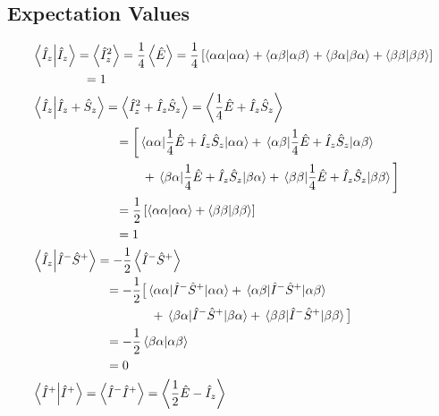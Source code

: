\begin{appendixtext}
\subsection{Expectation Values}
\begin{align*}
&\bra{\hat{I}_z} \ket{\hat{I}_z} = \expval{\hat{I}_z^2} = \frac{1}{4} \expval{\hat{E}} = \frac{1}{4} \left[\bra{\alpha \alpha} \ket{\alpha \alpha} + \bra{\alpha \beta} \ket{\alpha \beta} + \bra{\beta \alpha} \ket{\beta \alpha} + \bra{\beta \beta} \ket{\beta \beta}\right] \\
&\hspace{41pt}= 1 \\
&\bra{\hat{I}_z} \ket{\hat{I}_z + \hat{S}_z} = \expval{\hat{I}_z^2 + \hat{I}_z \hat{S}_z} = \expval{\frac{1}{4} \hat{E} + \hat{I}_z \hat{S}_z} \\
&\hspace{67pt}= \bigg[\mel{\alpha \alpha}{\frac{1}{4} \hat{E} + \hat{I}_z\hat{S}_z}{\alpha \alpha} + \mel{\alpha \beta}{\frac{1}{4} \hat{E} + \hat{I}_z\hat{S}_z}{\alpha \beta} \\
&\hspace{88pt} + \mel{\beta \alpha}{\frac{1}{4} \hat{E} + \hat{I}_z\hat{S}_z}{\beta \alpha} + \mel{\beta \beta}{\frac{1}{4} \hat{E} + \hat{I}_z\hat{S}_z}{\beta \beta} \bigg] \\
&\hspace{67pt} = \frac{1}{2} \left[\bra{\alpha \alpha} \ket{\alpha \alpha} + \bra{\beta \beta} \ket{\beta \beta}\right] \\
& \hspace{67pt} = 1 \\
&\bra{\hat{I}_z} \ket{\hat{I}^- \hat{S}^+} = -\frac{1}{2}\expval{\hat{I}^- \hat{S}^+} \\
& \hspace{59pt} = -\frac{1}{2} \big[ \mel{\alpha \alpha}{\hat{I}^- \hat{S}^+}{\alpha\alpha} + \mel{\alpha \beta}{\hat{I}^- \hat{S}^+}{\alpha\beta}  \\
& \hspace{95pt} + \mel{\beta \alpha}{\hat{I}^- \hat{S}^+}{\beta\alpha} + \mel{\beta \beta}{\hat{I}^- \hat{S}^+}{\beta\beta} \big] \\
& \hspace{59pt} = -\frac{1}{2} \bra{\beta \alpha} \ket{\alpha \beta} \\
& \hspace{59pt} = 0 \\
&\bra{\hat{I}^+} \ket{\hat{I}^+} = \expval{\hat{I}^- \hat{I}^+} = \expval{\frac{1}{2} \hat{E} - \hat{I}_z} \\

\end{align*}
\end{appendixtext}

